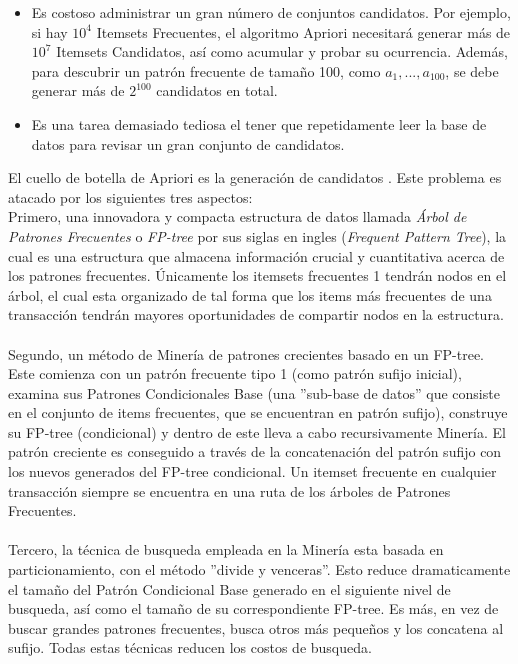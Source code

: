 \begin{itemize}
\item Es costoso administrar un gran n\'umero de conjuntos candidatos. Por ejemplo, si hay $10^{4}$ Itemsets
Frecuentes, el algoritmo Apriori necesitar\'a generar m\'as de $10^{7}$ Itemsets Candidatos, as\'i como acumular
y probar su ocurrencia. Adem\'as, para descubrir un patr\'on frecuente de tama\~no 100, como
${a_{1},...,a_{100}}$, se debe generar m\'as de $2^{100}$ candidatos en total.
\item Es una tarea demasiado tediosa el tener que repetidamente leer la base de datos para revisar un gran
conjunto de candidatos.
\end{itemize}
El cuello de botella de Apriori es la generaci\'on de candidatos \cite{15}. Este problema es atacado por los
siguientes tres aspectos:\\

Primero, una innovadora y compacta estructura de datos llamada \textit{\'Arbol de Patrones Frecuentes} o 
\textit{FP-tree} por sus siglas en ingles (\textit{Frequent Pattern Tree}), la cual es una estructura que 
almacena informaci\'on crucial y cuantitativa acerca de los patrones frecuentes. \'Unicamente los itemsets
frecuentes 1 tendr\'an nodos en el \'arbol, el cual esta organizado de tal forma que los items m\'as
frecuentes de una transacci\'on tendr\'an mayores oportunidades de compartir nodos en la estructura.\\ \\
Segundo, un m\'etodo de Miner\'ia de patrones crecientes basado en un FP-tree. Este comienza con un patr\'on
frecuente tipo 1 (como patr\'on sufijo inicial), examina sus Patrones Condicionales Base (una ''sub-base de
datos'' que consiste en el conjunto de items frecuentes, que se encuentran en patr\'on sufijo), construye su
FP-tree (condicional) y dentro de este lleva a cabo recursivamente Miner\'ia. El patr\'on creciente es 
conseguido a trav\'es de la concatenaci\'on del patr\'on sufijo con los nuevos generados del FP-tree condicional.
Un itemset frecuente en cualquier transacci\'on siempre se encuentra en una ruta de los \'arboles de Patrones
Frecuentes.\\ \\
Tercero, la t\'ecnica de busqueda empleada en la Miner\'ia esta basada en particionamiento, con el m\'etodo
''divide y venceras''. Esto reduce dramaticamente el tama\~no del Patr\'on Condicional Base generado en el 
siguiente nivel de busqueda, as\'i como el tama\~no de su correspondiente FP-tree. Es m\'as, en vez de buscar
grandes patrones frecuentes, busca otros m\'as peque\~nos y los concatena al sufijo. Todas estas t\'ecnicas 
reducen los costos de busqueda.

